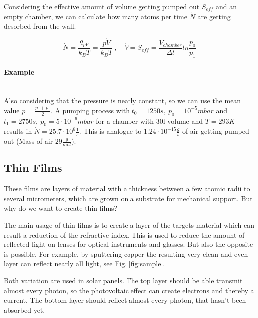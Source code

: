 \documentclass[]{article}
\begin{document}
Considering the effective amount of volume getting pumped out $S_{eff}$ and an empty chamber, we can calculate how many atoms per time $\dot{N}$ are getting desorbed from the wall.

\[ \dot{N}=\frac{q_{pV}}{k_BT}= \frac{p\dot{V}}{k_BT} \: , \quad \dot{V}=S_{eff}= \frac{V_{chamber}}{\Delta t}ln \frac{p_0}{p_1} \]

\paragraph{Example}\mbox{}\\
Also considering that the pressure is nearly constant, so we can use the mean value $p=\frac{p_0+p_1}{2}$. A pumping process with $t_0=1250s,\: p_0=10^{-5}mbar$ and $t_1=2750s,\: p_0=5\cdot 10^{-6}mbar$ for a chamber with 30l volume and $T=293K$ results in $\dot{N}=25.7\cdot 10^{6} \frac{1}{s}$. This is analogue to $1.24\cdot 10^{-15} \frac{g}{s}$ of air getting pumped out (Mass of air $29 \frac{g}{mol}$).
\label{dn}


\subsection{Thin Films}
These films are layers of material with a thickness between a few atomic radii to several micrometers, which are grown on a substrate for mechanical support. But why do we want to create thin films?

The main usage of thin films is to create a layer of the targets material which can result a reduction of the refractive index. This is used to reduce the amount of reflected light on lenses for optical instruments and glasses. But also the opposite is possible. For example, by sputtering copper the resulting very clean and even layer can reflect nearly all light, see Fig. \ref{fig:sample}. 

Both variation are used in solar panels. The top layer should be able transmit almost every photon, so the photovoltaic effect can create electrons and thereby a current. The bottom layer should reflect almost every photon, that hasn't been absorbed yet.
\end{document}
